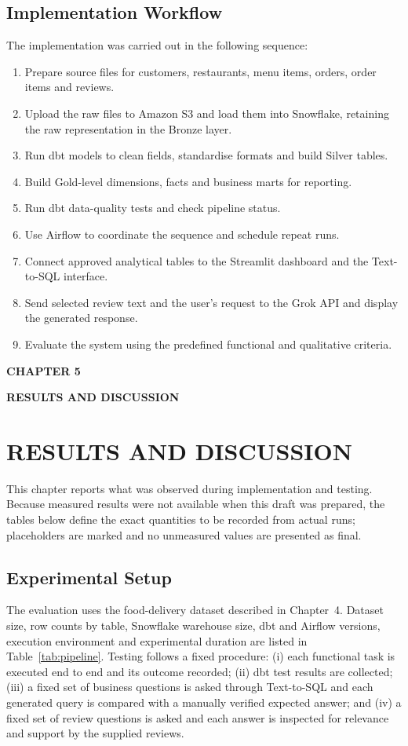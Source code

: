 \documentclass[12pt,a4paper]{report}
\newcommand{\chaptersplit}[2]{%
  \clearpage
  \thispagestyle{empty}%
  \vspace*{\fill}
  \begin{center}
    {\fontsize{16}{20}\selectfont\bfseries CHAPTER #1\par}
    \vspace{1.2cm}
    {\fontsize{16}{20}\selectfont\bfseries #2\par}
  \end{center}
  \vspace*{\fill}
  \clearpage
}
\begin{document}
\section{Implementation Workflow}
The implementation was carried out in the following sequence:
\begin{enumerate}[leftmargin=2em]
\item Prepare source files for customers, restaurants, menu items, orders, order items and reviews.
\item Upload the raw files to Amazon S3 and load them into Snowflake, retaining the raw representation in the Bronze layer.
\item Run dbt models to clean fields, standardise formats and build Silver tables.
\item Build Gold-level dimensions, facts and business marts for reporting.
\item Run dbt data-quality tests and check pipeline status.
\item Use Airflow to coordinate the sequence and schedule repeat runs.
\item Connect approved analytical tables to the Streamlit dashboard and the Text-to-SQL interface.
\item Send selected review text and the user's request to the Grok API and display the generated response.
\item Evaluate the system using the predefined functional and qualitative criteria.
\end{enumerate}

\chaptersplit{5}{RESULTS AND DISCUSSION}

\chapter{RESULTS AND DISCUSSION}

\noindent This chapter reports what was observed during implementation and testing. Because measured results were not available when this draft was prepared, the tables below define the exact quantities to be recorded from actual runs; placeholders are marked and no unmeasured values are presented as final.

\section{Experimental Setup}
The evaluation uses the food-delivery dataset described in Chapter~4. Dataset size, row counts by table, Snowflake warehouse size, dbt and Airflow versions, execution environment and experimental duration are listed in Table~\ref{tab:pipeline}. Testing follows a fixed procedure: (i) each functional task is executed end to end and its outcome recorded; (ii) dbt test results are collected; (iii) a fixed set of business questions is asked through Text-to-SQL and each generated query is compared with a manually verified expected answer; and (iv) a fixed set of review questions is asked and each answer is inspected for relevance and support by the supplied reviews.
\end{document}
